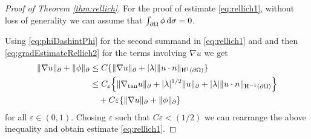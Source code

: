 \begin{proof}[Proof of Theorem \ref{thm:rellich}]
  For the proof of estimate \eqref{eq:rellich1}, without loss of generality we can assume that $\int_{\partial\Omega} \phi \, {\operatorname{d}\!{\sigma}} = 0$.

  Using \eqref{eq:phiDashintPhi} for the second summand  in \eqref{eq:rellich1} and and then \eqref{eq:gradEstimateRellich2} for the terms involving $\nabla u$ we get
  \begin{align*}
    \|\nabla u\|_\partial + \|\phi\|_\partial
    &\leq C \{ \|\nabla u\|_\partial + |\lambda| \|u \cdot n \|_{\mathrm{H}^1(\partial\Omega)} \} \\
    &\leq C_\varepsilon \Big\{ \|\nabla_{\mathrm{tan}} u \|_\partial + |\lambda|^{1/2} \|u\|_\partial + |\lambda| \| u\cdot n\|_{\mathrm{H}^{-1}(\partial\Omega)} \Big\} \\
    &\quad + C \varepsilon \{ \|\nabla u\|_\partial + \|\phi\|_\partial \}
  \end{align*}
  for all $\varepsilon \in (0,1)$.
  Chosing $\varepsilon$ such that $C \varepsilon < (1/2)$ we can rearrange the above inequality and obtain estimate \eqref{eq:rellich1}.


\end{proof}
